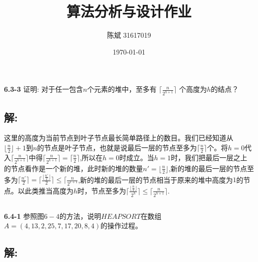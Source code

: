 \documentclass{ctexart}
\title{算法分析与设计作业}
\author{陈斌 31617019}%
\date{\ukdate\today}
\begin{document}
		\maketitle
		\subsection*{}
			\textbf{6.3-3}
			\textnormal{证明: 对于任一包含$n$个元素的堆中，至多有 $\lceil\frac{n}{2^{h+1}}\rceil$ 个高度为$h$的结点？}
		\subsection*{解:}
			这里的高度为当前节点到叶子节点最长简单路径上的数目。我们已经知道从$\lfloor\frac{n}{2}\rfloor+1$到$n$的节点是叶子节点，也就是说最后一层的节点至多为$\lceil\frac{n}{2}\rceil$个。将$h=0$代入$\lceil\frac{n}{2^{h+1}}\rceil$中得$\lceil\frac{n}{2^{h+1}}\rceil = \lceil\frac{n}{2}\rceil$,所以在$h = 0$时成立。当$h = 1$时，我们把最后一层之上的节点看作是一个新的堆，此时新的堆的数量$n'=\lfloor\frac{n}{2}\rfloor$,新的堆的最后一层的节点至多为$\lceil\frac{n'}{2}\rceil = \lceil\frac{\lfloor\frac{n'}{2}\rfloor}{2}\rceil\leqslant\lceil\frac{n}{2^{1+1}}$,新的堆的最后一层的节点相当于原来的堆中高度为$1$的节点。以此类推当高度为$h$时，节点至多为$\lceil\frac{\lfloor\frac{n}{2}\rfloor}{2^h}\rceil\leqslant\lceil\frac{n}{2^{h+1}}\rceil$.
		\subsection*{}
			\textbf{6.4-1}
			\textnormal{参照图$6-4$的方法，说明$HEAPSORT$在数组$A = (4,13,2,25,7,17,20,8,4)$的操作过程。}
		\subsection*{解:}
\end{document}
